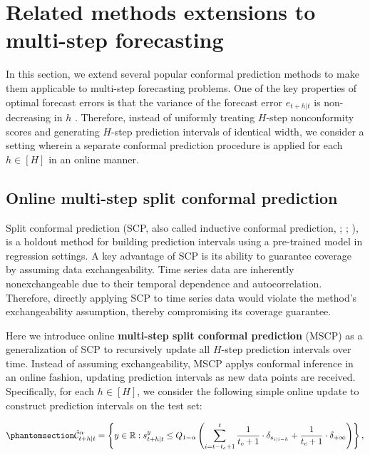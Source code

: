 \documentclass[
  11pt,
  a4paper,
]{article}
\theoremstyle{plain}
\theoremstyle{remark}
\begin{document}
\section{Related methods extensions to multi-step
forecasting}\label{sec-ext}

In this section, we extend several popular conformal prediction methods
to make them applicable to multi-step forecasting problems. One of the
key properties of optimal forecast errors is that the variance of the
forecast error \(e_{t+h|t}\) is non-decreasing in \(h\)
\autocite{diebold1996,patton2007}. Therefore, instead of uniformly
treating \(H\)-step nonconformity scores and generating \(H\)-step
prediction intervals of identical width, we consider a setting wherein a
separate conformal prediction procedure is applied for each
\(h \in [H]\) in an online manner.

\subsection{Online multi-step split conformal
prediction}\label{online-multi-step-split-conformal-prediction}

Split conformal prediction (SCP, also called inductive conformal
prediction, \textcite{papadopoulos2002}; \textcite{vovk2005};
\textcite{lei2018}), is a holdout method for building prediction
intervals using a pre-trained model in regression settings. A key
advantage of SCP is its ability to guarantee coverage by assuming data
exchangeability. Time series data are inherently nonexchangeable due to
their temporal dependence and autocorrelation. Therefore, directly
applying SCP to time series data would violate the method's
exchangeability assumption, thereby compromising its coverage guarantee.

Here we introduce online \textbf{multi-step split conformal prediction}
(MSCP) as a generalization of SCP to recursively update all \(H\)-step
prediction intervals over time. Instead of assuming exchangeability,
MSCP applys conformal inference in an online fashion, updating
prediction intervals as new data points are received. Specifically, for
each \(h \in [H]\), we consider the following simple online update to
construct prediction intervals on the test set:

\begin{equation}\phantomsection\label{eq-mscp}{
\hat{\mathcal{C}}_{t+h|t}^{\alpha} = \left\{y\in\mathbb{R}: s_{t+h|t}^{y} \leq Q_{1-\alpha}\left(\sum_{i=t-t_c+1}^{t}\frac{1}{t_c+1}\cdot\delta_{s_{i|i-h}}+\frac{1}{t_c+1}\cdot\delta_{+\infty}\right)\right\},
}\end{equation}
\end{document}
